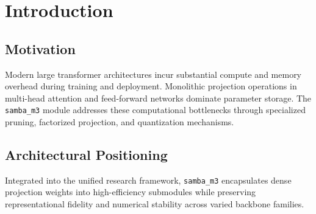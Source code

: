 \section{Introduction}

\subsection{Motivation}
Modern large transformer architectures incur substantial compute and memory overhead during training and deployment. Monolithic projection operations in multi-head attention and feed-forward networks dominate parameter storage. The \texttt{samba_m3} module addresses these computational bottlenecks through specialized pruning, factorized projection, and quantization mechanisms.

\subsection{Architectural Positioning}
Integrated into the unified research framework, \texttt{samba_m3} encapsulates dense projection weights into high-efficiency submodules while preserving representational fidelity and numerical stability across varied backbone families.
